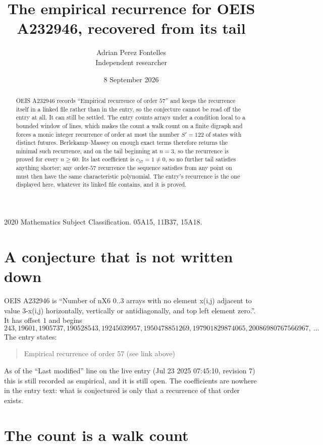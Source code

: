 \documentclass[11pt,a4paper]{article}
\title{The empirical recurrence for OEIS A232946, recovered from its tail}
\author{Adrian Perez Fontelles\\ \small Independent researcher}
\date{8 September 2026}
\theoremstyle{plain}
\theoremstyle{definition}
\begin{document}
\maketitle

\begin{abstract}
OEIS A232946 records ``Empirical recurrence of order $57$'' and keeps the recurrence itself in
a linked file rather than in the entry, so the conjecture cannot be read off the entry at all.
It can still be settled. The entry counts arrays under a condition local to a bounded window of
lines, which makes the count a walk count on a finite digraph and forces a monic integer
recurrence of order at most the number $S'=122$ of states with distinct futures. Berlekamp--Massey on
enough exact terms therefore returns the minimal such recurrence, and on the tail beginning at $n=3$, so the recurrence is proved for every $n\ge60$.
Its last coefficient is $c_{57}=1\neq0$, so no further tail satisfies anything
shorter; any order-$57$ recurrence the sequence satisfies from any point on must then have
the same characteristic polynomial. The entry's recurrence is the one displayed here, whatever
its linked file contains, and it is proved.
\end{abstract}

\noindent\small 2020 Mathematics Subject Classification. 05A15, 11B37, 15A18.\normalsize

\section{A conjecture that is not written down}

OEIS A232946 is ``Number of nX6 0..3 arrays with no element x(i,j) adjacent to value 3-x(i,j) horizontally, vertically or antidiagonally, and top left element zero.''. It has offset $1$ and begins
\[
243, 19601, 1905737, 190528543, 19245039957, 1950478851269, 197901829874065, 20086980767566967,\ \dots
\]
The entry states:
\begin{quote}
Empirical recurrence of order 57 (see link above)
\end{quote}
As of the ``Last modified'' line on the live entry (Jul 23 2025 07:45:10, revision 7)
this is still recorded as empirical, and it is still open. The coefficients are nowhere in the
entry text: what is conjectured is only that a recurrence of that order exists.

\section{The count is a walk count}
\end{document}
